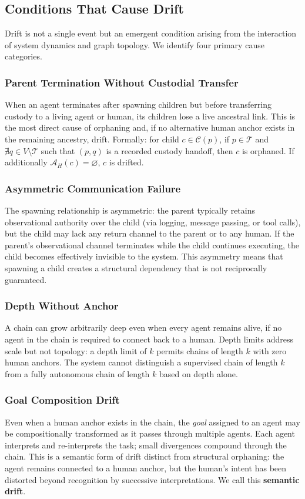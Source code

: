\subsection{Conditions That Cause Drift}

Drift is not a single event but an emergent condition arising from the interaction of system dynamics and graph topology. We identify four primary cause categories.

\subsubsection{Parent Termination Without Custodial Transfer}
When an agent terminates after spawning children but before transferring custody to a living agent or human, its children lose a live ancestral link. This is the most direct cause of orphaning and, if no alternative human anchor exists in the remaining ancestry, drift. Formally: for child $c \in \mathcal{C}(p)$, if $p \in \mathcal{T}$ and $\nexists q \in V \setminus \mathcal{T}$ such that $(p, q)$ is a recorded custody handoff, then $c$ is orphaned. If additionally $\mathcal{A}_H(c) = \varnothing$, $c$ is drifted.

\subsubsection{Asymmetric Communication Failure}
The spawning relationship is asymmetric: the parent typically retains observational authority over the child (via logging, message passing, or tool calls), but the child may lack any return channel to the parent or to any human. If the parent's observational channel terminates while the child continues executing, the child becomes effectively invisible to the system. This asymmetry means that spawning a child creates a structural dependency that is not reciprocally guaranteed.

\subsubsection{Depth Without Anchor}
A chain can grow arbitrarily deep even when every agent remains alive, if no agent in the chain is required to connect back to a human. Depth limits address scale but not topology: a depth limit of $k$ permits chains of length $k$ with zero human anchors. The system cannot distinguish a supervised chain of length $k$ from a fully autonomous chain of length $k$ based on depth alone.

\subsubsection{Goal Composition Drift}
Even when a human anchor exists in the chain, the \textit{goal} assigned to an agent may be compositionally transformed as it passes through multiple agents. Each agent interprets and re-interprets the task; small divergences compound through the chain. This is a semantic form of drift distinct from structural orphaning: the agent remains connected to a human anchor, but the human's intent has been distorted beyond recognition by successive interpretations. We call this \textbf{semantic drift}.

